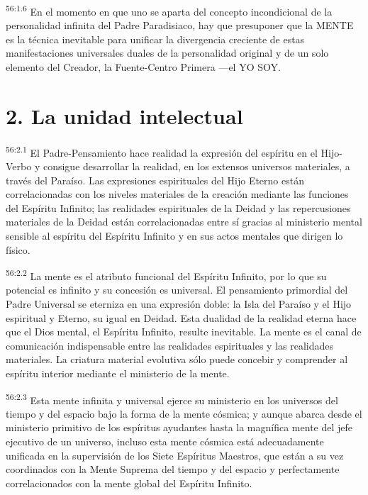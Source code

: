 \par
\textsuperscript{56:1.6} En el momento en que uno se aparta del concepto incondicional de la personalidad infinita del Padre Paradisiaco, hay que presuponer que la MENTE es la técnica inevitable para unificar la divergencia creciente de estas manifestaciones universales duales de la personalidad original y de un solo elemento del Creador, la Fuente-Centro Primera ---el YO SOY.

\section*{2. La unidad intelectual}
\par
\textsuperscript{56:2.1} El Padre-Pensamiento hace realidad la expresión del espíritu en el Hijo-Verbo y consigue desarrollar la realidad, en los extensos universos materiales, a través del Paraíso. Las expresiones espirituales del Hijo Eterno están correlacionadas con los niveles materiales de la creación mediante las funciones del Espíritu Infinito; las realidades espirituales de la Deidad y las repercusiones materiales de la Deidad están correlacionadas entre sí gracias al ministerio mental sensible al espíritu del Espíritu Infinito y en sus actos mentales que dirigen lo físico.

\par
\textsuperscript{56:2.2} La mente es el atributo funcional del Espíritu Infinito, por lo que su potencial es infinito y su concesión es universal. El pensamiento primordial del Padre Universal se eterniza en una expresión doble: la Isla del Paraíso y el Hijo espiritual y Eterno, su igual en Deidad. Esta dualidad de la realidad eterna hace que el Dios mental, el Espíritu Infinito, resulte inevitable. La mente es el canal de comunicación indispensable entre las realidades espirituales y las realidades materiales. La criatura material evolutiva sólo puede concebir y comprender al espíritu interior mediante el ministerio de la mente.

\par
\textsuperscript{56:2.3} Esta mente infinita y universal ejerce su ministerio en los universos del tiempo y del espacio bajo la forma de la mente cósmica; y aunque abarca desde el ministerio primitivo de los espíritus ayudantes hasta la magnífica mente del jefe ejecutivo de un universo, incluso esta mente cósmica está adecuadamente unificada en la supervisión de los Siete Espíritus Maestros, que están a su vez coordinados con la Mente Suprema del tiempo y del espacio y perfectamente correlacionados con la mente global del Espíritu Infinito.

